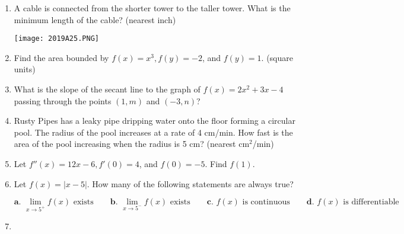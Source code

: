 \documentclass[../uilmath.tex]{subfiles}
\begin{document}
\begin{enumerate}[label=\bfseries\arabic*.]
    \item %
    A cable is connected from the shorter tower to the taller tower. What is the minimum length of the cable? (nearest inch)
    \begin{center}
        \texttt{[image: 2019A25.PNG]}
    \end{center}

    \item %
    Find the area bounded by $f(x)=x^3, f(y)=-2$, and $f(y)=1$. (square units)

    \item %
    What is the slope of the secant line to the graph of $f(x)=2x^2+3x-4$ passing through the points $(1,m)$ and $(-3,n)$?

    \item %
    Rusty Pipes has a leaky pipe dripping water onto the floor forming a circular pool. The radius of the pool increases at a rate of 4 cm/min.
    How fast is the area of the pool increasing when the radius is 5 cm? (nearest cm$^2$/min)

    \item %
    Let $f''(x)=12x-6, f'(0)=4$, and $f(0)=-5$. Find $f(1)$.

    \item %
    Let $f(x)=|x-5|$. How many of the following statements are always true?

    \[ \textbf{a. } \lim_{x\to 5^+} f(x)\text{ exists} \qquad \textbf{b. } \lim_{x\to5^-} f(x)\text{ exists}\qquad \textbf{c. } f(x) \text{ is continuous} \qquad \textbf{d. } f(x) \text{ is differentiable}\] 

    \item %
    
    
\end{enumerate}
\end{document}
